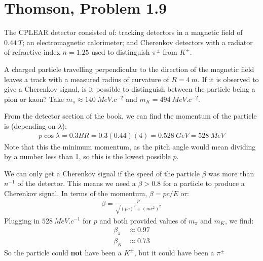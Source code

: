 \documentclass[12pt]{article}
\begin{document}
\section{Thomson, Problem 1.9}
\begin{problem}
  The CPLEAR detector consisted of: tracking detectors in a magnetic field of $\SI{0.44}{T}$; an electromagnetic calorimeter; and Cherenkov detectors with a radiator of refractive index $n=1.25$ used to distinguish $\pi^\pm$ from $K^\pm$.

  A charged particle travelling perpendicular to the direction of the magnetic field leaves a track with a measured radius of curvature of $R=\SI{4}{m}$. If it is observed to give a Cherenkov signal, is it possible to distinguish between the particle being a pion or kaon? Take $m_\pi\approx\SI{140}{MeV.c^{-2}}$ and $m_K=\SI{494}{MeV.c^{-2}}$.
\end{problem}
From the detector section of the book, we can find the momentum of the particle is (depending on $\lambda$):
\begin{align*}
  p\cos\lambda=0.3 BR=0.3 (0.44) (4)=\SI{0.528}{GeV}=\SI{528}{MeV}
\end{align*}
Note that this the minimum momentum, as the pitch angle would mean dividing by a number less than 1, so this is the lowest possible $p$.

We can only get a Cherenkov signal if the speed of the particle $\beta$ was more than $n^{-1}$ of the detector. This means we need a $\beta>0.8$ for a particle to produce a Cherenkov signal. In terms of the momentum, $\beta=pc/E$ or:
\begin{align*}
  \beta=\frac{p}{\sqrt{(pc)^2+(mc^2)^2}}
\end{align*}
Plugging in $\SI{528}{MeV.c^{-1}}$ for $p$ and both provided values of $m_\pi$ and $m_K$, we find:
\begin{equation}
  \label{eq:p8}
  \begin{aligned}
    \beta_\pi &\approx 0.97\\
    \beta_K &\approx 0.73
  \end{aligned}
\end{equation}
So the particle could \textbf{not} have been a $K^\pm$, but it could have been a $\pi^\pm$
\newpage
\end{document}
